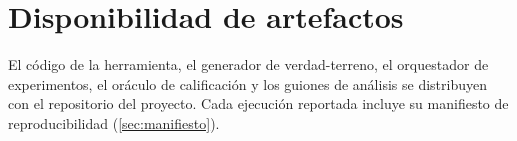 \documentclass[conference]{IEEEtran}
\begin{document}









\section*{Disponibilidad de artefactos}
El código de la herramienta, el generador de verdad-terreno, el orquestador de
experimentos, el oráculo de calificación y los guiones de análisis se
distribuyen con el repositorio del proyecto. Cada ejecución reportada incluye
su manifiesto de reproducibilidad (\cref{sec:manifiesto}).



\end{document}
